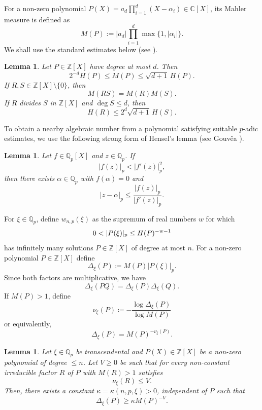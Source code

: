 \documentclass[12pt,reqno]{amsart}
\newtheorem{lemma}[theorem]{Lemma}
\theoremstyle{definition}
\theoremstyle{remark}
\newcommand{\Z}{\mathbb Z}
\newcommand{\Qp}{\mathbb Q_p}
\newcommand{\Zp}{\mathbb Z_p}
\begin{document}
For a non-zero polynomial $P(X)=a_d\prod_{i=1}^d(X-\alpha_i)\in\mathbb C[X]$, its Mahler measure is defined as
$$
M(P):= |a_d|\prod_{i=1}^d\max\{1,|\alpha_i|\}.
$$
We shall use the standard estimates below (see
\cite[Sections~1.6--1.7]{BombieriGubler}).

\begin{lemma}\label{lem:height-mahler}
Let $P\in\Z[X]$ have degree at most $d$. Then
$$
2^{-d}H(P)\leq M(P)\leq\sqrt{d+1}\,H(P).
$$
If $R,S\in\Z[X]\setminus\{0\}$, then
$$
M(RS)=M(R)M(S).
$$
If $R$ divides $S$ in $\Z[X]$ and $\deg S\leq d$, then
$$
H(R)\leq 2^d\sqrt{d+1}\,H(S).
$$
\end{lemma}


To obtain a nearby algebraic number from a polynomial satisfying suitable
$p$-adic estimates, we use the following strong form of Hensel's lemma (see
Gouv\^ea \cite{Gouvea}).

\begin{lemma}\label{lem:hensel}
Let $f\in\Qp[X]$ and $z\in\Qp$. If
$$
|f(z)|_p<|f'(z)|_p^2,
$$
then there exists $\alpha\in\Qp$ with $f(\alpha)=0$ and
$$
|z-\alpha|_p\leq\frac{|f(z)|_p}{|f'(z)|_p}.
$$
\end{lemma}

For $\xi\in \Qp$, define $w_{n,p}(\xi)$ as the supremum of real numbers $w$ for which
\begin{equation}\label{defn:w_{n,p}}
0<|P(\xi)|_p\leq H(P)^{-w-1}
\end{equation}
has infinitely many solutions $P\in\Z[X]$ of degree at most $n$. For a non-zero polynomial $P\in\Z[X]$ define
$$
\Delta_\xi(P)\coloneqq M(P)|P(\xi)|_p.
$$
Since both factors are multiplicative, we have
$$
\Delta_\xi(PQ)=\Delta_\xi(P)\Delta_\xi(Q).
$$
If $M(P)>1$, define
$$
\nu_\xi(P)
\coloneqq-\frac{\log\Delta_\xi(P)}{\log M(P)}
$$
or equivalently,
$$
\Delta_\xi(P)=M(P)^{-\nu_\xi(P)}.
$$

\begin{lemma}\label{lem:factor-lower}
Let $\xi\in\Qp$ be transcendental and $P(X)\in\Z[X]$ be a non-zero polynomial of degree $\leq n$. Let $V\geq 0$ be such that for every non-constant irreducible factor $R$ of $P$ with $M(R)>1$ satisfies
$$
\nu_\xi(R)\leq V.
$$
Then, there exists a constant $\kappa=\kappa(n,p,\xi)>0$, independent of $P$ such that 
$$
\Delta_\xi(P)\geq\kappa M(P)^{-V}.
$$
\end{lemma}
\end{document}
